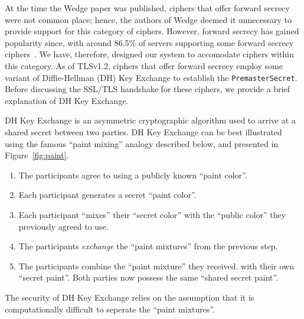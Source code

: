 \documentclass[../../main.tex]{subfiles}
\begin{document}
At the time the Wedge paper was published, ciphers that offer forward
secrecy were not common place; hence, the authors of Wedge deemed it
unnecessary to provide support for this category of ciphers. However,
forward secrecy has gained popularity since, with around 86.5\% of
servers supporting some forward secrecy ciphers~\cite{fs_stats}. We
have, therefore, designed our system to accomodate ciphers within this
category. As of TLSv1.2, ciphers that offer forward secrecy employ
some variant of Diffie-Hellman (DH) Key Exchange to establish the
\texttt{PremasterSecret}. Before discussing the SSL/TLS handshake for
these ciphers, we provide a brief explanation of DH Key Exchange.

DH Key Exchange is an asymmetric cryptographic algorithm used to
arrive at a shared secret between two parties. DH Key Exchange can be
best illustrated using the famous ``paint mixing'' analogy described
below, and presented in Figure~\ref{fig:paint}.
\begin{enumerate}
  \item The participants agree to using a publicly known ``paint
    color''.
  \item Each participant generates a secret ``paint color''.
  \item Each participant ``mixes'' their ``secret color'' with the
    ``public color'' they previously agreed to use.
  \item The participants \textit{exchange} the ``paint mixtures'' from
    the previous step.
  \item The participants combine the ``paint mixture'' they received.
    with their own ``secret paint''. Both parties now possess the same
    ``shared secret paint''.
\end{enumerate}
The security of DH Key Exchange relies on the assumption that it is
computationally difficult to seperate the ``paint mixtures''.
\end{document}
